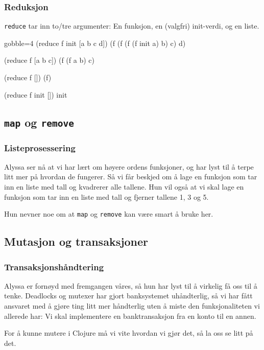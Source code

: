 \documentclass{beamer}
\begin{document}
\begin{frame}[fragile, t]
  \frametitle{Reduksjon}

  {\tt reduce} tar inn to/tre argumenter: En funksjon, en (valgfri) init-verdi,
  og en liste.

  \vspace{3mm}
  \begin{cljcode*}{gobble=4}
    (reduce f init [a b c d])
    (f (f (f (f init a) b) c) d)

    (reduce f [a b c])
    (f (f a b) c)

    (reduce f [])
    (f)

    (reduce f init [])
    init
  \end{cljcode*}
\end{frame}

\subsection{{\tt map} og {\tt remove}}
\begin{frame}
  \frametitle{Listeprosessering}

  Alyssa ser nå at vi har lært om høyere ordens funksjoner, og har lyst til å
  terpe litt mer på hvordan de fungerer. Så vi får beskjed om å lage en funksjon
  som tar inn en liste med tall og kvadrerer alle tallene. Hun vil også at vi
  skal lage en funksjon som tar inn en liste med tall og fjerner tallene 1, 3 og
  5.

  \vspace{3mm}
  \pause Hun nevner noe om at {\tt map} og {\tt remove} kan være smart å bruke
  her.
\end{frame}

\subsection{Mutasjon og transaksjoner}
\begin{frame}
  \frametitle{Transaksjonshåndtering}

  Alyssa er fornøyd med fremgangen våres, så hun har lyst til å virkelig få oss
  til å tenke. Deadlocks og mutexer har gjort banksystemet uhåndterlig, så vi
  har fått ansvaret med å gjøre ting litt mer håndterlig uten å miste den
  funksjonaliteten vi allerede har: Vi skal implementere en banktransaksjon fra
  en konto til en annen.

  \vspace{3mm}
  \pause For å kunne mutere i Clojure må vi vite hvordan vi gjør det, så la oss
  se litt på det.
\end{frame}
\end{document}
